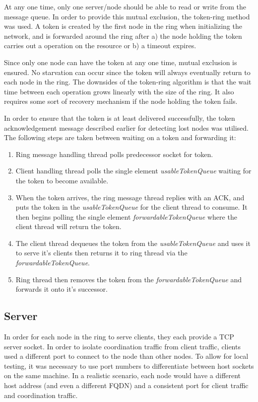 \documentclass[12pt]{article}
\begin{document}
At any one time, only one server/node should be able to read or write from the message queue. In order to provide this mutual exclusion, the token-ring method was used. A token is created by the first node in the ring when initializing the network, and is forwarded around the ring after a) the node holding the token carries out a operation on the resource or b) a timeout expires. 

Since only one node can have the token at any one time, mutual exclusion is ensured. No starvation can occur since the token will always eventually return to each node in the ring. The downsides of the token-ring algorithm is that the wait time between each operation grows linearly with the size of the ring. It also requires some sort of recovery mechanism if the node holding the token fails.

In order to ensure that the token is at least delivered successfully, the token acknowledgement message described earlier for detecting lost nodes was utilised. The following steps are taken between waiting on a token and forwarding it:

\begin{enumerate}
	\item Ring message handling thread polls predecessor socket for token.
	\item Client handling thread polls the single element \emph{usableTokenQueue} waiting for the token to become available.
	\item When the token arrives, the ring message thread replies with an ACK, and puts the token in the \emph{usableTokenQueue} for the client thread to consume. It then begins polling the single element \emph{forwardableTokenQueue} where the client thread will return the token.
	\item The client thread dequeues the token from the \emph{usableTokenQueue} and uses it to serve it's clients then returns it to ring thread via the \emph{forwardableTokenQueue}.
	\item Ring thread then removes the token from the \emph{forwardableTokenQueue} and forwards it onto it's successor.
\end{enumerate}

\subsection{Server}

In order for each node in the ring to serve clients, they each provide a TCP server socket. In order to isolate coordination traffic from client traffic, clients used a different port to connect to the node than other nodes. To allow for local testing, it was necessary to use port numbers to differentiate between host sockets on the same machine. In a realistic scenario, each node would have a different host address (and even a different FQDN) and a consistent port for client traffic and coordination traffic. 
\end{document}
